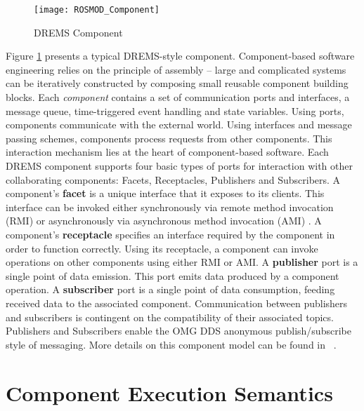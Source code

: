 \begin{figure}[h]
	\centering
	\texttt{[image: ROSMOD\_Component]}
	\caption{DREMS Component}
	\label{fig:DREMS_Component}
\end{figure}


Figure \ref{fig:DREMS_Component} presents a typical DREMS-style component. Component-based software engineering relies on the principle of assembly -- large and complicated systems can be iteratively constructed by composing small reusable component building blocks. Each \emph{component} contains a set of communication ports and interfaces, a message queue, time-triggered event handling and state variables. Using ports, components communicate with the external world. Using interfaces and message passing schemes, components process requests from other components. This interaction mechanism lies at the heart of component-based software. Each DREMS component supports four basic types of ports for interaction with other collaborating components: Facets, Receptacles, Publishers and Subscribers. A component's {\bf facet} is a unique interface that it exposes to its clients. This interface can be invoked either synchronously via remote method invocation (RMI) or asynchronously via asynchronous method invocation (AMI) \cite{waldo1998remote, raje1997asynchronous}. A component's {\bf receptacle} specifies an interface required by the component in order to function correctly. Using its receptacle, a component can invoke operations on other components using either RMI or AMI. A {\bf publisher} port is a single point of data emission. This port emits data produced by a component operation. A {\bf subscriber} port is a single point of data consumption, feeding received data to the associated component. Communication between publishers and subscribers is contingent on the compatibility of their associated topics. Publishers and Subscribers enable the OMG DDS anonymous publish/subscribe \cite{eugster2003many} style of messaging. More details on this component model can be found in ~\cite{ISIS_F6_ISORC:13}.

\section{Component Execution Semantics}


